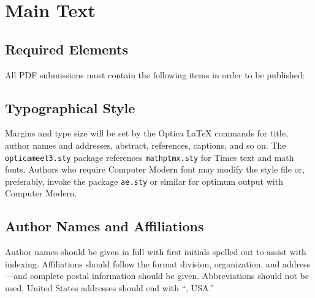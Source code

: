 \documentclass[letterpaper, 10pt]{article}
\begin{document}
\section{Main Text}

\subsection{Required Elements}
All PDF submissions must contain the following items in order to be published:


\subsection{Typographical Style}
Margins and type size will be set by the Optica \LaTeX{}
commands for title, author names and addresses, abstract,
references, captions, and so on. The \texttt{opticameet3.sty} package
references \texttt{mathptmx.sty} for Times text and math fonts.
Authors who require Computer Modern font may modify the style file
or, preferably, invoke the package \texttt{ae.sty} or similar for
optimum output with Computer Modern.


\subsection{Author Names and Affiliations}
Author names should be given in full with first initials spelled out to assist with indexing.
Affiliations should follow the format division, organization, and address---and complete postal information should be given.
Abbreviations should not be used. United States addresses should end
with ``, USA.''
\end{document}
